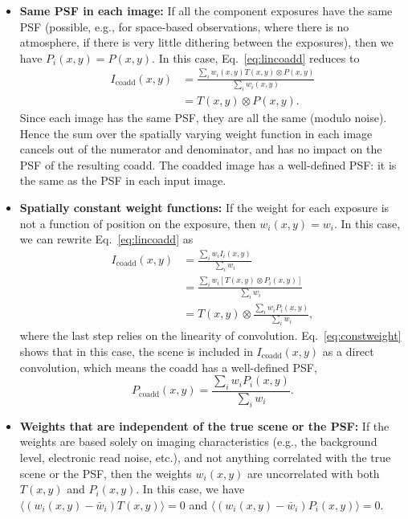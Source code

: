 \documentclass[modern]{style_and_logos/lsstdescnote}
\begin{document}
\begin{itemize}
    \item \textbf{Same PSF in each image:} If all the component exposures have the same PSF (possible, e.g., for space-based observations, where there is no atmosphere, if there is very little dithering between the exposures), then we have $P_i(x,y)=P(x,y)$.  In this case, Eq.~\eqref{eq:lincoadd} reduces to
    \begin{align*}
         I_\text{coadd}(x,y) &= \frac{\sum_i w_i(x,y) T(x,y)\otimes P(x,y)}{\sum_i w_i(x,y)} \\
         &= T(x,y)\otimes P(x,y).
    \end{align*}
    Since each image has the same PSF, they are all the same (modulo noise).  Hence the sum over the spatially varying weight function in each image cancels out of the numerator and denominator, and has no impact on the PSF of the resulting coadd.  The coadded image has a well-defined PSF: it is the same as the PSF in each input image.
    
    \item \textbf{Spatially constant weight functions:}  If the weight for each exposure is not a function of position on the exposure, then  $w_i(x,y)=w_i$.  In this case, we can rewrite Eq.~\eqref{eq:lincoadd} as
    \begin{align}
        I_\text{coadd}(x,y) &= \frac{\sum_i w_i I_i(x,y)}{\sum_i w_i} \nonumber\\
        &= \frac{\sum_i w_i \left[T(x,y) \otimes P_i(x,y)\right]}{\sum_i w_i} \nonumber \\
        &= T(x,y) \otimes \frac{\sum_i w_i P_i(x,y)}{\sum_i w_i},\label{eq:constweight}
    \end{align}
    where the last step relies on the linearity of convolution.  
    Eq.~\eqref{eq:constweight} shows that in this case, the scene is included in $I_\text{coadd}(x,y)$ as a direct convolution, which means the coadd has a well-defined PSF, 
    \begin{equation}\label{eq:constweightpsf}
        P_\text{coadd}(x,y) = \frac{\sum_i w_i P_i(x,y)}{\sum_i w_i}.
    \end{equation}

    \item \textbf{Weights that are independent of the true scene or the PSF:}  If the weights are based solely on imaging characteristics (e.g., the background level, electronic read noise, etc.), and not anything correlated with the true scene or the PSF, then the weights $w_i(x,y)$ are uncorrelated with both $T(x,y)$ and $P_i(x,y)$.
    In this case, we have $\langle (w_i(x,y)-\bar w_i) T(x,y) \rangle = 0$ and $\langle (w_i(x,y) - \bar w_i) P_i(x,y) \rangle = 0$.  
    

\end{itemize}
\end{document}
